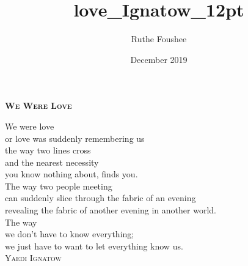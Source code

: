 \documentclass[12pt]{memoir}
\title{love_Ignatow_12pt}
\author{Ruthe Foushee}
\date{December 2019}
\begin{document}
\thispagestyle{empty}
\textbf{\textsc{\large We Were Love}}
\vspace{26pt}

We were love\\
or love was suddenly remembering us\\
the way two lines cross\\
and the nearest necessity\\
you know nothing about, finds you.\\
The way two people meeting\\
can suddenly slice through the fabric of an evening\\
revealing the fabric of another evening in another world.\\
The way\\
we don’t have to know everything;\\
we just have to want to let everything know us.\\

\vspace{11pt}
\hspace{90pt} \textsc{Yaedi Ignatow}\\
\vfill
\end{document}
